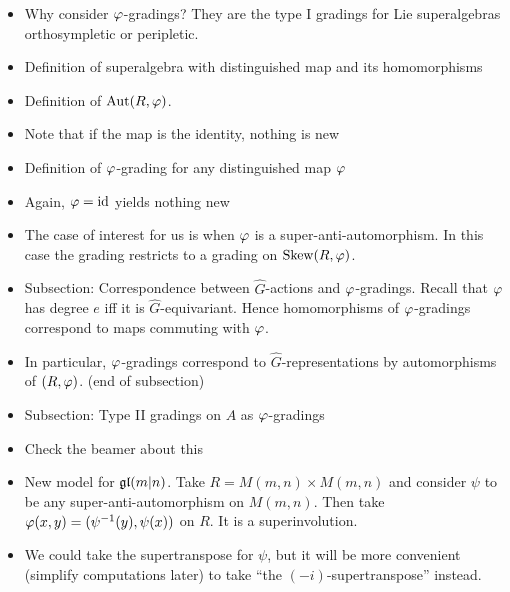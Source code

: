 \documentclass{amsbook}
\begin{document}
    \begin{itemize}
        \item Why consider $\varphi$-gradings? They are the type I gradings for Lie superalgebras orthosympletic or peripletic.
        
        \item Definition of superalgebra with distinguished map and its homomorphisms
        
        \item Definition of $\operatorname{Aut} (R, \varphi)$.
        
        \item Note that if the map is the identity, nothing is new
        
        \item Definition of $\varphi$-grading for any distinguished map $\varphi$
        
        \item Again, $\varphi = \operatorname{id}$ yields nothing new
        
        \item The case of interest for us is when $\varphi$ is a super-anti-automorphism. In this case the grading restricts to a grading on $\operatorname{Skew}(R, \varphi)$.
        
        \item Subsection: Correspondence between $\widehat G$-actions and $\varphi$-gradings. Recall that $\varphi$ has degree $e$ iff it is $\widehat G$-equivariant. Hence homomorphisms of $\varphi$-gradings correspond to maps commuting with $\varphi$.
        
        \item In particular, $\varphi$-gradings correspond to $\widehat G$-representations by automorphisms of $(R, \varphi)$. (end of subsection)
        
        \item Subsection: Type II gradings on $A$ as $\varphi$-gradings
        
        \item Check the beamer about this
        
        \item New model for $\mathfrak{gl}(m|n)$. Take $R = M(m,n) \times M(m,n)$ and consider $\psi$ to be any super-anti-automorphism on $M(m,n)$. Then take $\varphi (x, y) = (\psi^{-1} (y) , \psi (x) )$ on $R$. It is a superinvolution.
        
        \item We could take the supertranspose for $\psi$, but it will be more convenient (simplify computations later) to take ``the $(-i)$-supertranspose'' instead.
        

\end{itemize}
\end{document}
